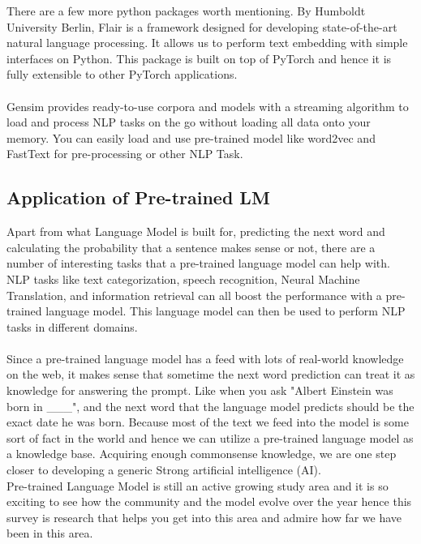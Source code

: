 \documentclass[a4paper, 11pt]{article}
\begin{document}
There are a few more python packages worth mentioning. By Humboldt University Berlin, Flair\cite{akbik2018coling} is a framework designed for developing state-of-the-art natural language processing. It allows us to perform text embedding with simple interfaces on Python. This package is built on top of PyTorch and hence it is fully extensible to other PyTorch applications.\\
\\
Gensim\cite{rehurek2011gensim} provides ready-to-use corpora and models with a streaming algorithm to load and process NLP tasks on the go without loading all data onto your memory. You can easily load and use pre-trained model like word2vec\cite{mikolov2013efficient} and FastText\cite{FastText} for pre-processing or other NLP Task.\\

\subsection{Application of Pre-trained LM}
Apart from what Language Model is built for, predicting the next word and calculating the probability that a sentence makes sense or not, there are a number of interesting tasks that a pre-trained language model can help with. NLP tasks like text categorization, speech recognition, Neural Machine Translation, and information retrieval can all boost the performance with a pre-trained language model. This language model can then be used to perform NLP tasks in different domains.\\
\\
Since a pre-trained language model has a feed with lots of real-world knowledge on the web, it makes sense that sometime the next word prediction can treat it as knowledge for answering the prompt. Like when you ask "Albert Einstein was born in \_\_\_", and the next word that the language model predicts should be the exact date he was born. Because most of the text we feed into the model is some sort of fact in the world and hence we can utilize a pre-trained language model as a knowledge base. Acquiring enough commonsense knowledge, we are one step closer to developing a generic Strong artificial intelligence (AI)\cite{butz2021towards}.\\

Pre-trained Language Model is still an active growing study area and it is so exciting to see how the community and the model evolve over the year hence this survey is research that helps you get into this area and admire how far we have been in this area. 




\appendix
\end{document}
